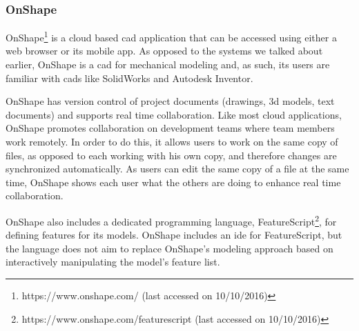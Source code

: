 \subsubsection{OnShape}
OnShape\footnote{https://www.onshape.com/ (last accessed on 10/10/2016)} is a cloud based \gls{cad} application that can be accessed using either a web browser or its mobile app.
As opposed to the systems we talked about earlier, OnShape is a \gls{cad} for mechanical modeling and, as such, its users are familiar with \glspl{cad} like SolidWorks and Autodesk Inventor.

OnShape has version control of project documents (drawings, 3d models, text documents) and supports real time collaboration.
Like most cloud applications, OnShape promotes collaboration on development teams where team members work remotely.
In order to do this, it allows users to work on the same copy of files, as opposed to each working with his own copy, and therefore changes are synchronized automatically.
As users can edit the same copy of a file at the same time, OnShape shows each user what the others are doing to enhance real time collaboration.

OnShape also includes a dedicated programming language, FeatureScript\footnote{https://www.onshape.com/featurescript (last accessed on 10/10/2016)}, for defining features for its models.
OnShape includes an \gls{ide} for FeatureScript, but the language does not aim to replace OnShape's modeling approach based on interactively manipulating the model's feature list.



